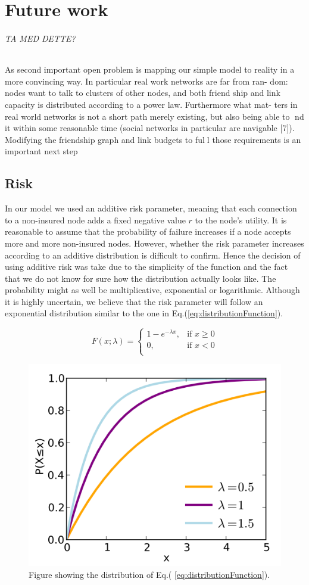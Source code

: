 \chapter{Future work}
\label{chp:futurework} 
\subparagraph{TA MED DETTE?}
As second important open problem is mapping our simple model to reality
in a more convincing way. In particular real work networks are far from ran-
dom: nodes want to talk to clusters of other nodes, and both friend ship and
link capacity is distributed according to a power law. Furthermore what mat-
ters in real world networks is not a short path merely existing, but also being
able to nd it within some reasonable time (social networks in particular are
navigable [7]). Modifying the friendship graph and link budgets to full those
requirements is an important next step
\section{Risk}
In our model we used an additive risk parameter, meaning that each connection to a non-insured node adds a fixed negative value $r$ to the node's utility. It is reasonable to assume that the probability of failure increases if a node accepts more and more non-insured nodes. However, whether the risk parameter increases according to an additive distribution is difficult to confirm. Hence the decision of using additive risk was take due to the simplicity of the function and the fact that we do not know for sure how the distribution actually looks like. The probability might as well be multiplicative, exponential or logarithmic. Although it is highly uncertain, we believe that the risk parameter will follow an exponential distribution similar to the one in Eq.(\ref{eq:distributionFunction}).

\begin{equation}
    F(x;\lambda)= 
\begin{cases}
    1-e^{-\lambda x} ,& \text{if } x \geq 0\\
   0,& \text{if }  x<0\\
    
    
\end{cases}
\label{eq:distributionFunction}
\end{equation}



\begin{figure}[h]
\centering
  \includegraphics[width=0.5\linewidth]{../Figures/exponentialFunction.png}
  \caption{\label{fig:exponentialFunction} Figure showing the distribution of Eq.( \ref{eq:distributionFunction}). }
\end{figure}

